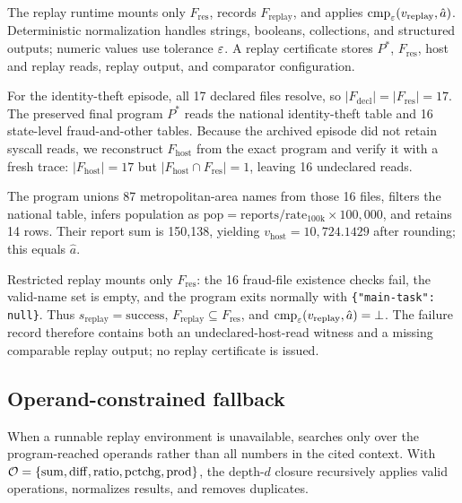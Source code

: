 The replay runtime mounts only $F_{\mathrm{res}}$, records
$F_{\mathrm{replay}}$, and applies
$\operatorname{cmp}_{\varepsilon}(v_{\mathrm{replay}},\hat a)$. Deterministic
normalization handles strings, booleans, collections, and structured outputs;
numeric values use tolerance $\varepsilon$. A replay certificate stores $P^*$,
$F_{\mathrm{res}}$, host and replay reads, replay output, and comparator
configuration.

For the identity-theft episode, all 17 declared files resolve, so
$|F_{\mathrm{decl}}|=|F_{\mathrm{res}}|=17$. The preserved final program
$P^*$ reads the national identity-theft table and 16 state-level
fraud-and-other tables. Because the archived episode did not retain syscall
reads, we reconstruct $F_{\mathrm{host}}$ from the exact program and verify it
with a fresh trace: $|F_{\mathrm{host}}|=17$ but
$|F_{\mathrm{host}}\cap F_{\mathrm{res}}|=1$, leaving 16 undeclared reads.

The program unions 87 metropolitan-area names from those 16 files, filters the
national table, infers population as
$\mathrm{pop}=\mathrm{reports}/\mathrm{rate}_{100\mathrm{k}}
\times100{,}000$, and retains 14 rows. Their report sum is 150,138, yielding
$v_{\mathrm{host}}=10{,}724.1429$ after rounding; this equals $\hat a$.

Restricted replay mounts only $F_{\mathrm{res}}$: the 16 fraud-file existence
checks fail, the valid-name set is empty, and the program exits normally with
\texttt{\{"main-task": null\}}. Thus
$s_{\mathrm{replay}}=\mathrm{success}$,
$F_{\mathrm{replay}}\subseteq F_{\mathrm{res}}$, and
$\operatorname{cmp}_{\varepsilon}(v_{\mathrm{replay}},\hat a)=\bot$.
The failure record therefore contains both an undeclared-host-read witness and
a missing comparable replay output; no replay certificate is issued.

\subsection{Operand-constrained fallback}
\label{sec:closure}

When a runnable replay environment is unavailable, \ledger searches only over
the program-reached operands rather than all numbers in the cited context.
With
$\mathcal{O}=\{\mathrm{sum},\mathrm{diff},\mathrm{ratio},
\mathrm{pctchg},\mathrm{prod}\}$,
the depth-$d$ closure recursively applies valid operations, normalizes results,
and removes duplicates.

